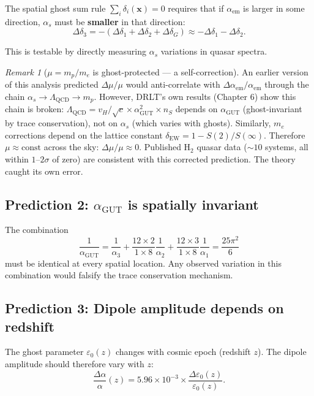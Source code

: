 \documentclass[12pt]{article}
\theoremstyle{remark}
\newtheorem{remark}[theorem]{Remark}
\begin{document}
The spatial ghost sum rule $\sum_i \delta_i(\mathbf{x}) = 0$ requires that if $\alpha_\text{em}$ is larger in some direction, $\alpha_s$ must be \textbf{smaller} in that direction:
\begin{equation}
\Delta\delta_3 = -(\Delta\delta_1 + \Delta\delta_2 + \Delta\delta_G) \approx -\Delta\delta_1 - \Delta\delta_2.
\end{equation}

This is testable by directly measuring $\alpha_s$ variations in quasar spectra.

\begin{remark}[$\mu = m_p/m_e$ is ghost-protected --- a self-correction]
An earlier version of this analysis predicted $\Delta\mu/\mu$ would anti-correlate with $\Delta\alpha_\text{em}/\alpha_\text{em}$ through the chain $\alpha_s \to \Lambda_\text{QCD} \to m_p$. However, DRLT's own results (Chapter 6) show this chain is broken: $\Lambda_\text{QCD} = v_H/\sqrt{c} \times \alpha_\text{GUT}^2 \times n_S$ depends on $\alpha_\text{GUT}$ (ghost-invariant by trace conservation), not on $\alpha_s$ (which varies with ghosts). Similarly, $m_e$ corrections depend on the lattice constant $\delta_\text{EW} = 1 - S(2)/S(\infty)$. Therefore $\mu \approx \text{const}$ across the sky: $\Delta\mu/\mu \approx 0$. Published H$_2$ quasar data ($\sim 10$ systems, all within $1$--$2\sigma$ of zero) are consistent with this corrected prediction. The theory caught its own error.
\end{remark}

\subsection{Prediction 2: $\alpha_\text{GUT}$ is spatially invariant}

The combination
\begin{equation}
\frac{1}{\alpha_\text{GUT}} = \frac{1}{\alpha_3} + \frac{12 \times 2}{1 \times 8}\frac{1}{\alpha_2} + \frac{12 \times 3}{1 \times 8}\frac{1}{\alpha_1} = \frac{25\pi^2}{6}
\end{equation}
must be identical at every spatial location. Any observed variation in this combination would falsify the trace conservation mechanism.

\subsection{Prediction 3: Dipole amplitude depends on redshift}

The ghost parameter $\varepsilon_0(z)$ changes with cosmic epoch (redshift $z$). The dipole amplitude should therefore vary with $z$:
\begin{equation}
\frac{\Delta\alpha}{\alpha}(z) = 5.96 \times 10^{-3} \times \frac{\Delta\varepsilon_0(z)}{\varepsilon_0(z)}.
\end{equation}
\end{document}
